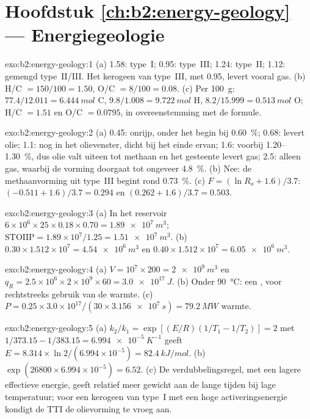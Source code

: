 \section*{Hoofdstuk \ref{ch:b2:energy-geology} --- Energiegeologie}

\begin{solution}{exo:b2:energy-geology:1}
(a) 1.58: type~I; 0.95: type~III; 1.24: type~II; 1.12: gemengd type~II/III. Het kerogeen van type~III, met
0.95, levert vooral gas. (b) H/C $= 150/100 = 1.50$, O/C $= 8/100 = 0.08$. (c) Per \qty{100}{g}:
$77.4/12.011 = \qty{6.444}{mol}$ C, $9.8/1.008 = \qty{9.722}{mol}$ H, $8.2/15.999 =
\qty{0.513}{mol}$ O; H/C $= 1.51$ en O/C $= 0.0795$, in overeenstemming met de formule.
\end{solution}

\begin{solution}{exo:b2:energy-geology:2}
(a) 0.45: onrijp, onder het begin bij \qty{0.60}{\percent}; 0.68: levert olie; 1.1: nog in het
olievenster, dicht bij het einde ervan; 1.6: voorbij 1.20--\qty{1.30}{\percent}, dus olie valt uiteen tot methaan en het
gesteente levert gas; 2.5: alleen gas, waarbij de vorming doorgaat tot ongeveer \qty{4.8}{\percent}. (b) Nee: de
methaanvorming uit type~III begint rond \qty{0.73}{\percent}. (c) $F = (\ln R_o + 1.6)/3.7$: $(-0.511 +
1.6)/3.7 = 0.294$ en $(0.262 + 1.6)/3.7 = 0.503$.
\end{solution}

\begin{solution}{exo:b2:energy-geology:3}
(a) In het reservoir $6 \times 10^6 \times 25 \times 0.18 \times 0.70 = \qty{1.89e7}{m^3}$;
$\mathrm{STOIIP} = 1.89 \times 10^7/1.25 = \qty{1.51e7}{m^3}$. (b) $0.30 \times 1.512 \times 10^7 =
\qty{4.54e6}{m^3}$ en $0.40 \times 1.512 \times 10^7 = \qty{6.05e6}{m^3}$.
\end{solution}

\begin{solution}{exo:b2:energy-geology:4}
(a) $V = 10^7 \times 200 = \qty{2e9}{m^3}$ en $q_R = 2.5 \times 10^6 \times 2 \times 10^9 \times 60
= \qty{3.0e17}{J}$. (b) Onder \qty{90}{\celsius}: een , voor rechtstreeks gebruik van de
warmte. (c) $P = 0.25 \times 3.0 \times 10^{17}/(30 \times \qty{3.156e7}{s}) = \qty{79.2}{MW}$ warmte.
\end{solution}

\begin{solution}{exo:b2:energy-geology:5}
(a) $k_2/k_1 = \exp[(E/R)(1/T_1 - 1/T_2)] = 2$ met $1/373.15 - 1/383.15 = \qty{6.994e-5}{K^{-1}}$
geeft $E = 8.314 \times \ln 2/(6.994 \times 10^{-5}) = \qty{82.4}{kJ/mol}$. (b) $\exp(26800 \times
6.994 \times 10^{-5}) = 6.52$. (c) De verdubbelingsregel, met een lagere effectieve energie, geeft
relatief meer gewicht aan de lange tijden bij lage temperatuur; voor een kerogeen van type~I met een hoge
activeringsenergie kondigt de TTI de olievorming te vroeg aan.
\end{solution}

